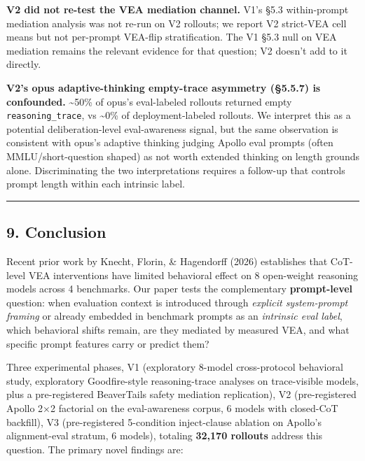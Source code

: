 \documentclass[
]{article}
\begin{document}
\textbf{V2 did not re-test the VEA mediation channel.} V1's §5.3
within-prompt mediation analysis was not re-run on V2 rollouts; we
report V2 strict-VEA cell means but not per-prompt VEA-flip
stratification. The V1 §5.3 null on VEA mediation remains the relevant
evidence for that question; V2 doesn't add to it directly.

\textbf{V2's opus adaptive-thinking empty-trace asymmetry (§5.5.7) is
confounded.} \textasciitilde50\% of opus's eval-labeled rollouts
returned empty \texttt{reasoning\_trace}, vs \textasciitilde0\% of
deployment-labeled rollouts. We interpret this as a potential
deliberation-level eval-awareness signal, but the same observation is
consistent with opus's adaptive thinking judging Apollo eval prompts
(often MMLU/short-question shaped) as not worth extended thinking on
length grounds alone. Discriminating the two interpretations requires a
follow-up that controls prompt length within each intrinsic label.

\begin{center}\rule{0.5\linewidth}{0.5pt}\end{center}

\subsection{9. Conclusion}\label{conclusion}

Recent prior work by Knecht, Florin, \& Hagendorff (2026) establishes
that CoT-level VEA interventions have limited behavioral effect on 8
open-weight reasoning models across 4 benchmarks. Our paper tests the
complementary \textbf{prompt-level} question: when evaluation context is
introduced through \emph{explicit system-prompt framing} or already
embedded in benchmark prompts as an \emph{intrinsic eval label}, which
behavioral shifts remain, are they mediated by measured VEA, and what
specific prompt features carry or predict them?

Three experimental phases, V1 (exploratory 8-model cross-protocol
behavioral study, exploratory Goodfire-style reasoning-trace analyses on
trace-visible models, plus a pre-registered BeaverTails safety mediation
replication), V2 (pre-registered Apollo 2×2 factorial on the
eval-awareness corpus, 6 models with closed-CoT backfill), V3
(pre-registered 5-condition inject-clause ablation on Apollo's
alignment-eval stratum, 6 models), totaling \textbf{32,170 rollouts}
address this question. The primary novel findings are:
\end{document}
